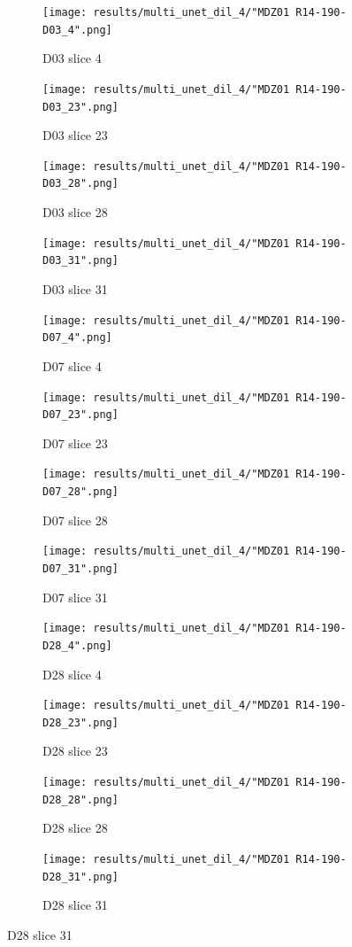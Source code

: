 \begin{figure}[!htb]  
    \centering %
\begin{subfigure}{0.25\textwidth}
  \texttt{[image: results/multi\_unet\_dil\_4/"MDZ01 R14-190-D03\_4".png]}
  \caption{D03 slice 4}
\end{subfigure}\hfil %
\begin{subfigure}{0.25\textwidth}
  \texttt{[image: results/multi\_unet\_dil\_4/"MDZ01 R14-190-D03\_23".png]}
  \caption{D03 slice 23}
\end{subfigure}\hfil %
\begin{subfigure}{0.25\textwidth}
  \texttt{[image: results/multi\_unet\_dil\_4/"MDZ01 R14-190-D03\_28".png]}
  \caption{D03 slice 28}
\end{subfigure}\hfil %
\begin{subfigure}{0.25\textwidth}
  \texttt{[image: results/multi\_unet\_dil\_4/"MDZ01 R14-190-D03\_31".png]}
  \caption{D03 slice 31}
\end{subfigure}

\medskip
\begin{subfigure}{0.25\textwidth}
  \texttt{[image: results/multi\_unet\_dil\_4/"MDZ01 R14-190-D07\_4".png]}
  \caption{D07 slice 4}
\end{subfigure}\hfil %
\begin{subfigure}{0.25\textwidth}
  \texttt{[image: results/multi\_unet\_dil\_4/"MDZ01 R14-190-D07\_23".png]}
  \caption{D07 slice 23}
\end{subfigure}\hfil %
\begin{subfigure}{0.25\textwidth}
  \texttt{[image: results/multi\_unet\_dil\_4/"MDZ01 R14-190-D07\_28".png]}
  \caption{D07 slice 28}
\end{subfigure}\hfil %
\begin{subfigure}{0.25\textwidth}
  \texttt{[image: results/multi\_unet\_dil\_4/"MDZ01 R14-190-D07\_31".png]}
  \caption{D07 slice 31}
\end{subfigure}

\medskip
\begin{subfigure}{0.25\textwidth}
  \texttt{[image: results/multi\_unet\_dil\_4/"MDZ01 R14-190-D28\_4".png]}
  \caption{D28 slice 4}
\end{subfigure}\hfil %
\begin{subfigure}{0.25\textwidth}
  \texttt{[image: results/multi\_unet\_dil\_4/"MDZ01 R14-190-D28\_23".png]}
  \caption{D28 slice 23}
\end{subfigure}\hfil %
\begin{subfigure}{0.25\textwidth}
  \texttt{[image: results/multi\_unet\_dil\_4/"MDZ01 R14-190-D28\_28".png]}
  \caption{D28 slice 28}
\end{subfigure}\hfil %
\begin{subfigure}{0.25\textwidth}
  \texttt{[image: results/multi\_unet\_dil\_4/"MDZ01 R14-190-D28\_31".png]}
  \caption{D28 slice 31}
\end{subfigure}
  

\end{figure}
